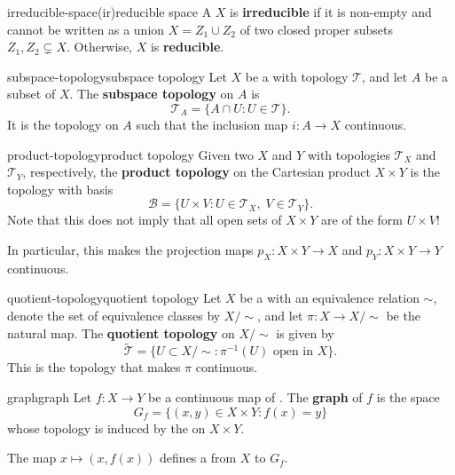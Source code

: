 \begin{topic}{irreducible-space}{(ir)reducible space}
    A  $X$ is \textbf{irreducible} if it is non-empty and cannot be written as a union $X = Z_1 \cup Z_2$ of two closed proper subsets $Z_1, Z_2 \subsetneq X$. Otherwise, $X$ is \textbf{reducible}.
\end{topic}

\begin{topic}{subspace-topology}{subspace topology}
    Let $X$ be a  with topology $\mathcal{T}$, and let $A$ be a subset of $X$. The \textbf{subspace topology} on $A$ is
    \[ \mathcal{T}_A = \{ A \cap U : U \in \mathcal{T} \} . \]
    It is the  topology on $A$ such that the inclusion map $i : A \to X$ continuous.
\end{topic}

\begin{topic}{product-topology}{product topology}
    Given two  $X$ and $Y$ with topologies $\mathcal{T}_X$ and $\mathcal{T}_Y$, respectively, the \textbf{product topology} on the Cartesian product $X \times Y$ is the topology with basis
    \[ \mathcal{B} = \{ U \times V : U \in \mathcal{T}_X, \; V \in \mathcal{T}_Y \} . \]
    Note that this does not imply that all open sets of $X \times Y$ are of the form $U \times V$!
    
    In particular, this makes the projection maps $p_X : X \times Y \to X$ and $p_Y : X \times Y \to Y$ continuous.
\end{topic}

\begin{topic}{quotient-topology}{quotient topology}
    Let $X$ be a  with an equivalence relation $\sim{}$, denote the set of equivalence classes by $X / \sim{}$, and let $\pi : X \to X / \sim{}$ be the natural map. The \textbf{quotient topology} on $X / \sim{}$ is given by
    \[ \tilde{\mathcal{T}} = \{ U \subset X / \sim{} : \pi^{-1}(U) \text{ open in } X \} . \]
    This is the  topology that makes $\pi$ continuous.
\end{topic}

\begin{topic}{graph}{graph}
    Let $f : X \to Y$ be a continuous map of . The \textbf{graph} of $f$ is the space
    \[ G_f = \{ (x, y) \in X \times Y : f(x) = y \} \]
    whose topology is induced by the  on $X \times Y$.
    
    The map $x \mapsto (x, f(x))$ defines a  from $X$ to $G_f$.
\end{topic}

